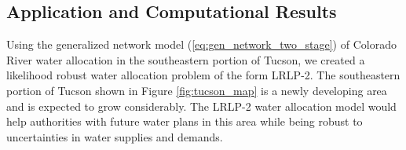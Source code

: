 \documentclass[12pt]{amsart}
\begin{document}
% 
% 

\subsection{Application and Computational Results} \label{sec:comp_results}

Using the generalized network model (\ref{eq:gen_network_two_stage}) of Colorado River water allocation in the southeastern portion of Tucson, we created a likelihood robust water allocation problem of the form LRLP-2.
The southeastern portion of Tucson shown in Figure \ref{fig:tucson_map} is a newly developing area and is expected to grow considerably. 
The LRLP-2 water allocation model would help authorities with future water plans in this area while being robust to uncertainties in water supplies and demands.
\end{document}
